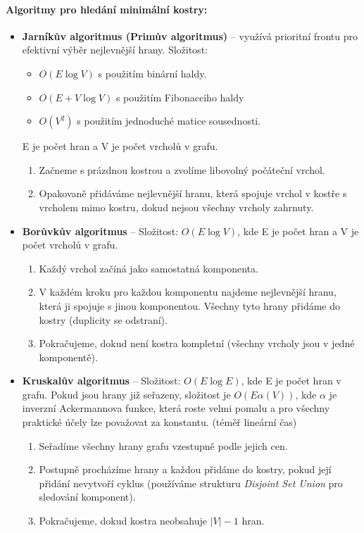 \paragraph*{Algoritmy pro hledání minimální kostry:}
\begin{itemize}
\item \textbf{Jarníkův algoritmus (Primův algoritmus)} -- využívá prioritní frontu pro efektivní 
výběr nejlevnější hrany. Složitost: 
\begin{itemize}
    \item $O(E \log V)$ s použitím binární haldy.
    \item $O(E + V \log V)$ s použitím Fibonacciho haldy
    \item $O(V^2)$ s použitím jednoduché matice sousednosti.
\end{itemize}
E je počet hran a V je počet vrcholů v grafu.
\begin{enumerate}
    \item Začneme s prázdnou kostrou a zvolíme libovolný počáteční vrchol.
    \item Opakovaně přidáváme nejlevnější hranu, která spojuje vrchol v kostře s 
    vrcholem mimo kostru, dokud nejsou všechny vrcholy zahrnuty.
\end{enumerate}

\item \textbf{Borůvkův algoritmus} -- Složitost: $O(E \log V)$, kde E je počet hran a V je počet vrcholů v grafu.
\begin{enumerate}
    \item Každý vrchol začíná jako samostatná komponenta.
    \item V každém kroku pro každou komponentu najdeme nejlevnější hranu, která ji spojuje s jinou komponentou. Všechny tyto hrany přidáme do kostry (duplicity se odstraní).
    \item Pokračujeme, dokud není kostra kompletní (všechny vrcholy jsou v jedné komponentě).
\end{enumerate}

\item \textbf{Kruskalův algoritmus} -- Složitost: $O(E \log E)$, kde E je počet hran v 
grafu. Pokud jsou hrany již seřazeny, složitost je $O(E \alpha(V))$, kde $\alpha$ je 
inverzní Ackermannova funkce, která roste velmi pomalu a pro všechny praktické účely 
lze považovat za konstantu. (téměř lineární čas)
\begin{enumerate}
    \item Seřadíme všechny hrany grafu vzestupně podle jejich cen.
    \item Postupně procházíme hrany a každou přidáme do kostry, pokud její přidání nevytvoří cyklus (používáme strukturu \textit{Disjoint Set Union} pro sledování komponent).
    \item Pokračujeme, dokud kostra neobsahuje $|V| - 1$ hran.
\end{enumerate}
\end{itemize}

